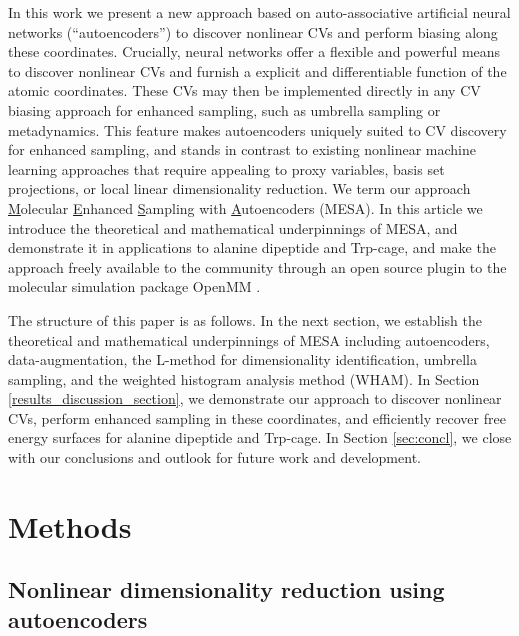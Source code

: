 \documentclass[12pt]{article}
\newcommand*{\blauw}[1]{#1}
\newcommand*{\groen}[1]{#1}
\begin{document}
In this work we present a new approach based on auto-associative artificial neural networks (``autoencoders'') \cite{scholz2002nonlinear,scholz2008nonlinear,hinton2006reducing,yan2007graph,wang2014generalized} to discover nonlinear CVs and perform biasing along these coordinates. Crucially, neural networks offer a flexible and powerful means to discover nonlinear CVs and furnish a explicit and differentiable function of the atomic coordinates. These CVs may then be implemented directly in any CV biasing approach for enhanced sampling, such as umbrella sampling or metadynamics. This feature makes autoencoders uniquely suited to CV discovery for enhanced sampling, and stands in contrast to existing nonlinear machine learning approaches that require appealing to proxy variables, basis set projections, or local linear dimensionality reduction. We term our approach \underline{M}olecular \underline{E}nhanced \underline{S}ampling with \underline{A}utoencoders (\groen{MESA}). In this article we introduce the theoretical and mathematical underpinnings of MESA, and demonstrate it in applications to alanine dipeptide and Trp-cage, and make the approach freely available to the community through an open source plugin to the molecular simulation package OpenMM \cite{eastman2017openmm,eastman2012openmm,friedrichs2009accelerating}.

The structure of this paper is as follows. In the \blauw{next section}, we establish the theoretical and mathematical underpinnings of MESA including autoencoders, data-augmentation, the L-method for dimensionality identification, umbrella sampling, and the weighted histogram analysis method (\groen{WHAM}). In \blauw{Section \ref{results_discussion_section}}, we demonstrate our approach to discover nonlinear CVs, perform enhanced sampling in these coordinates, and efficiently recover free energy surfaces for alanine dipeptide and Trp-cage. In \blauw{Section \ref{sec:concl}}, we close with our conclusions and outlook for future work and development. 




\section{\sffamily \Large Methods} \label{method_section}

\subsection{\sffamily \large Nonlinear dimensionality reduction using autoencoders}
\end{document}
